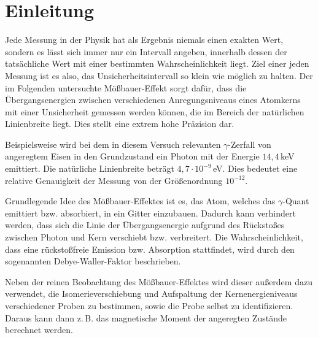 \section{Einleitung}

Jede Messung in der Physik hat als Ergebnis niemals einen exakten Wert, sondern es lässt sich immer nur ein Intervall angeben, innerhalb dessen der tatsächliche Wert mit einer bestimmten Wahrscheinlichkeit liegt. \cite{gum} Ziel einer jeden Messung ist es also, das Unsicherheitsintervall so klein wie möglich zu halten. Der im Folgenden untersuchte Mößbauer-Effekt sorgt dafür, dass die Übergangsenergien zwischen verschiedenen Anregungsniveaus eines Atomkerns mit einer Unsicherheit gemessen werden können, die im Bereich der natürlichen Linienbreite liegt. Dies stellt eine extrem hohe Präzision dar. 

Beispielsweise wird bei dem in diesem Versuch relevanten $\gamma$-Zerfall von angeregtem Eisen in den Grundzustand ein Photon mit der Energie $14,4\,$keV emittiert. Die natürliche Linienbreite beträgt $4,7\cdot 10^{-9}\,$eV. Dies bedeutet eine relative Genauigkeit der Messung von der Größenordnung $10^{-12}$. \cite{schatz}

Grundlegende Idee des Mößbauer-Effektes ist es, das Atom, welches das $\gamma$-Quant emittiert bzw. absorbiert, in ein Gitter einzubauen. Dadurch kann verhindert werden, dass sich die Linie der Übergangsenergie aufgrund des Rückstoßes zwischen Photon und Kern verschiebt bzw. verbreitert. Die Wahrscheinlichkeit, dass eine rückstoßfreie Emission bzw. Absorption stattfindet, wird durch den sogenannten Debye-Waller-Faktor beschrieben.

Neben der reinen Beobachtung des Mößbauer-Effektes wird dieser außerdem dazu verwendet, die Isomerieverschiebung und Aufspaltung der Kernenergieniveaus verschiedener Proben zu bestimmen, sowie die Probe selbst zu identifizieren. Daraus kann dann z.\,B. das magnetische Moment der angeregten Zustände berechnet werden.



